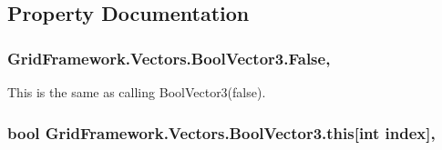 \subsection{Property Documentation}
\hypertarget{class_grid_framework_1_1_vectors_1_1_bool_vector3_ab4be6dcbe12c4ec6100b254e1d9bcd40_ab4be6dcbe12c4ec6100b254e1d9bcd40}{
\subsubsection[{False}]{ Grid\+Framework.\+Vectors.\+Bool\+Vector3.\+False\hspace{0.3cm}{\ttfamily [static]}, {\ttfamily [get]}}}\label{class_grid_framework_1_1_vectors_1_1_bool_vector3_ab4be6dcbe12c4ec6100b254e1d9bcd40_ab4be6dcbe12c4ec6100b254e1d9bcd40}
This is the same as calling {\ttfamily Bool\+Vector3(false)}. \hypertarget{class_grid_framework_1_1_vectors_1_1_bool_vector3_afefc01ade5cf181c20e030306439f660_afefc01ade5cf181c20e030306439f660}{
\subsubsection[{this[int index]}]{\setlength{\rightskip}{0pt plus 5cm}bool Grid\+Framework.\+Vectors.\+Bool\+Vector3.\+this\mbox{[}int index\mbox{]}\hspace{0.3cm}{\ttfamily [get]}, {\ttfamily [set]}}}\label{class_grid_framework_1_1_vectors_1_1_bool_vector3_afefc01ade5cf181c20e030306439f660_afefc01ade5cf181c20e030306439f660}


